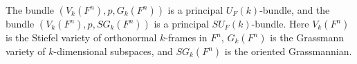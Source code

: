 The bundle $(V_k(F^n), p, G_k(F^n))$ is a principal $U_F(k)$-bundle, and the bundle $(V_k(F^n), p, SG_k(F^n))$ is a principal $SU_F(k)$-bundle. Here $V_k(F^n)$ is the Stiefel variety of orthonormal $k$-frames in $F^n$, $G_k(F^n)$ is the Grassmann variety of $k$-dimensional subspaces, and $SG_k(F^n)$ is the oriented Grassmannian.
